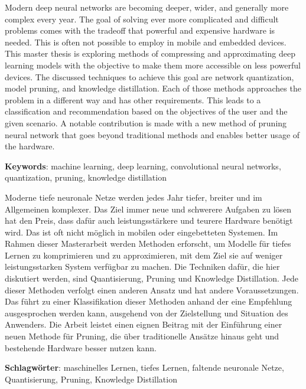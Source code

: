 
{
\null\vspace{\fill}
{}
Modern deep neural networks are becoming deeper, wider, and generally more complex every year. The goal of solving ever more complicated and difficult problems comes with the tradeoff that powerful and expensive hardware is nee\-ded. This is often not possible to employ in mobile and embedded devices. This master thesis is exploring methods of compressing and approximating deep learning models with the objective to make them more accessible on less powerful devices. The discussed techniques to achieve this goal are network quantization, model pruning, and knowledge distillation. Each of those methods approaches the problem in a different way and has other requirements. This leads to a classification and recommendation based on the objectives of the user and the given scenario. A notable contribution is made with a new method of pruning neural network that goes beyond traditional methods and enables better usage of the hardware.

\textbf{Keywords}: machine learning, deep learning, convolutional neural networks, quantization, pruning, knowledge distillation

\vspace{\fill}
}

{
\newpage
\null\vspace{\fill}
{}
Moderne tiefe neuronale Netze werden jedes Jahr tiefer, breiter und im Allgemeinen komplexer. Das Ziel immer neue und schwerere Aufgaben zu lösen hat den Preis, dass dafür auch leistungsstärkere und teurere Hardware benötigt wird. Das ist oft nicht möglich in mobilen oder eingebetteten Systemen. Im Rahmen dieser Masterarbeit werden Methoden erforscht, um Modelle für tiefes Lernen zu komprimieren und zu approximieren, mit dem Ziel sie auf weniger leistungsstarken System verfügbar zu machen. Die Techniken dafür, die hier diskutiert werden, sind Quantisierung, Pruning und Knowledge Distillation. Jede dieser Methoden verfolgt einen anderen Ansatz und hat andere Voraussetzungen. Das führt zu einer Klassifikation dieser Methoden anhand der eine Empfeh\-lung ausgesprochen werden kann, ausgehend von der Zielstellung und Situation des Anwenders. Die Arbeit leistet einen eignen Beitrag mit der Einführung einer neuen Methode für Pruning, die über traditionelle Ansätze hinaus geht und bestehende Hardware besser nutzen kann.

\textbf{Schlagwörter}: maschinelles Lernen, tiefes Lernen, faltende neuronale Netze, Quantisierung, Pruning, Knowledge Distillation
\vspace{\fill}
\newpage
}
